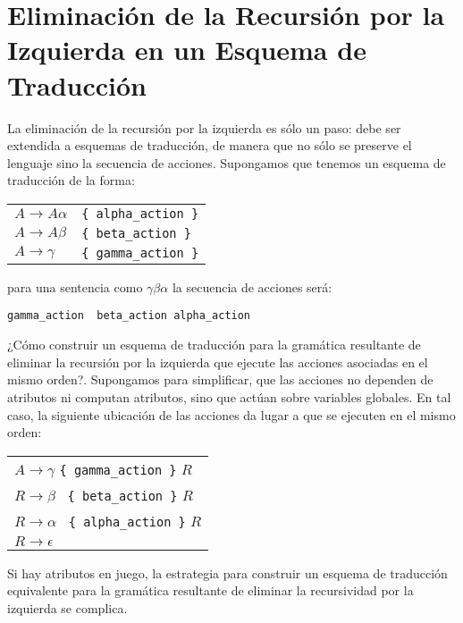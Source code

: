 \section{Eliminación de la Recursión por la Izquierda en un Esquema de Traducción}
\label{section:eliminarecesquem}
La eliminación de la recursión por la izquierda es sólo un paso: debe 
ser extendida a esquemas de traducción, 
de manera que no sólo se preserve el lenguaje
sino la secuencia de acciones. Supongamos que tenemos un esquema de
traducción de la forma:

\vspace{0.25cm}
\begin{tabular}{ll}
$A   \rightarrow A \alpha$  & \verb|{ alpha_action }|\\
$A   \rightarrow A \beta$   & \verb|{ beta_action }|\\
$A   \rightarrow \gamma$    & \verb|{ gamma_action }|
\end{tabular}
\vspace{0.25cm}

\noindent para una sentencia como $\gamma \beta \alpha$ la secuencia de
acciones será: 

\begin{center}
\verb|gamma_action  beta_action alpha_action|
\end{center}

¿Cómo construir un esquema de traducción para la gramática resultante
de eliminar la recursión por la izquierda que ejecute las acciones
asociadas en el mismo orden?. Supongamos para simplificar,
que las acciones no dependen
de atributos ni computan atributos, sino que actúan sobre
variables globales. En tal caso, la siguiente
ubicación de las acciones da lugar a que se ejecuten en el mismo
orden:

\vspace{0.25cm}
\begin{tabular}{l}
$A   \rightarrow \gamma$ \verb|{ gamma_action }| $R$\\
$R   \rightarrow \beta$ \verb| { beta_action }| $R$\\
$R   \rightarrow \alpha$ \verb| { alpha_action }| $R$\\
$R   \rightarrow \epsilon$  
\end{tabular}

Si hay atributos en juego, la estrategia para construir un
esquema de traducción equivalente para la gramática resultante
de eliminar la recursividad por la izquierda se complica.


\label{practica:pl0}

